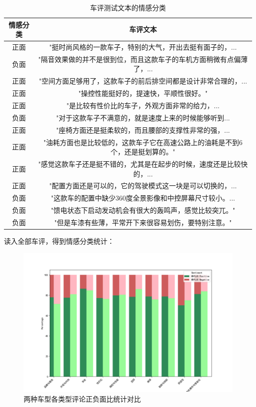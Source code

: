 \documentclass[UTF8,a4paper,15pt,titlepage,oneside]{ctexbook}
\begin{document}
  \begin{table}[H]
    \centering
    \begin{tabular}{cc}
    \toprule
    情感分类&车评文本\\
    \midrule
    \cellcolor{green!20}正面& "挺时尚风格的一款车子，特别的大气，开出去挺有面子的，...\\
    \cellcolor{red!20}负面& "隔音效果做的并不是很到位，而且这款车子的车机方面稍微有点偏薄了，...\\
    \cellcolor{green!20}正面& "空间方面足够用了，这款车子的前后排空间都是设计非常合理的，...\\
    \cellcolor{green!20}正面& "操控性能挺好的，提速快，平顺性很好。"\\
    \cellcolor{green!20}正面& "是比较有性价比的车子，外观方面非常的给力，...\\
    \cellcolor{red!20}负面& "对于这款车子不满意的，就是速度上来的时候能够听到...\\
    \cellcolor{green!20}正面& "座椅方面还是挺柔软的，而且腰部的支撑性非常的强，...\\
    \cellcolor{green!20}正面& "油耗方面也是比较低的，这款车子它在高速公路上的油耗是不到6个，还是挺划算的。"\\
    \cellcolor{green!20}正面& "感觉这款车子还是挺不错的，尤其是在起步的时候，速度还是比较快的，...\\
    \cellcolor{green!20}正面& "配置方面还是可以的，它的驾驶模式这一块是可以切换的，...\\
    \cellcolor{red!20}负面& "这款车的配置中缺少360度全景影像和中控屏幕尺寸较小。...\\
    \cellcolor{red!20}负面& "馈电状态下启动发动机会有很大的轰鸣声，感觉比较突兀。"\\
    \cellcolor{red!20}负面& "但是车漆有些薄，平常开下来很容易划伤，要特别注意。"\\
    
    \bottomrule
    \end{tabular}
    \caption{车评测试文本的情感分类}
    \end{table}
  
  读入全部车评，得到情感分类统计：


    \begin{figure}[htbp]
    \centering
      \includegraphics[width=0.8\linewidth]{pictures/53.png}
      \caption{两种车型各类型评论正负面比统计对比}
  
  \end{figure}
\end{document}

